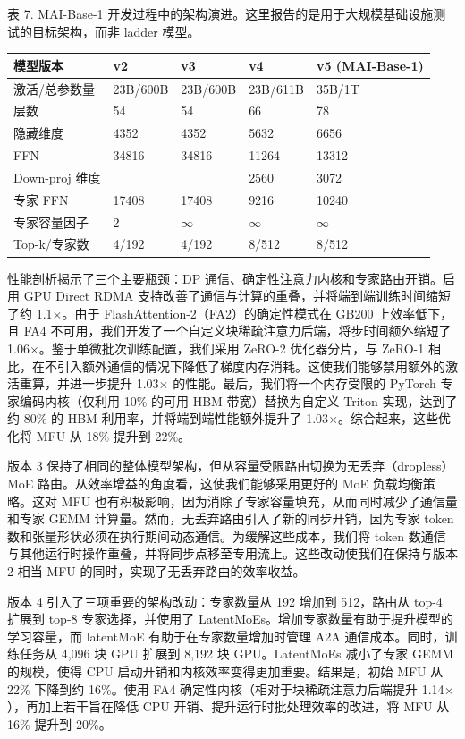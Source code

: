 表 7. MAI-Base-1 开发过程中的架构演进。这里报告的是用于大规模基础设施测试的目标架构，而非 ladder 模型。

{\def\LTcaptype{none} %
\begin{longtable}[]{@{}|l|l|l|l|l|@{}}
\toprule\noalign{}
\endhead
\bottomrule\noalign{}
\endlastfoot
\hline
模型版本 & v2 & v3 & v4 & v5 (MAI-Base-1) \\
\hline
激活/总参数量 & 23B/600B & 23B/600B & 23B/611B & 35B/1T \\
\hline
层数 & 54 & 54 & 66 & 78 \\
\hline
隐藏维度 & 4352 & 4352 & 5632 & 6656 \\
\hline
FFN & 34816 & 34816 & 11264 & 13312 \\
\hline
Down-proj 维度 & & & 2560 & 3072 \\
\hline
专家 FFN & 17408 & 17408 & 9216 & 10240 \\
\hline
专家容量因子 & 2 & $\infty$ & $\infty$ & $\infty$ \\
\hline
Top-k/专家数 & 4/192 & 4/192 & 8/512 & 8/512 \\
\hline
\end{longtable}
}

性能剖析揭示了三个主要瓶颈：DP 通信、确定性注意力内核和专家路由开销。启用 GPU Direct RDMA 支持改善了通信与计算的重叠，并将端到端训练时间缩短了约 1.1$\times$。由于 FlashAttention-2（FA2）的确定性模式在 GB200 上效率低下，且 FA4 不可用，我们开发了一个自定义块稀疏注意力后端，将步时间额外缩短了 1.06$\times$。鉴于单微批次训练配置，我们采用 ZeRO-2 优化器分片，与 ZeRO-1 相比，在不引入额外通信的情况下降低了梯度内存消耗。这使我们能够禁用额外的激活重算，并进一步提升 1.03$\times$ 的性能。最后，我们将一个内存受限的 PyTorch 专家编码内核（仅利用 10\% 的可用 HBM 带宽）替换为自定义 Triton 实现，达到了约 80\% 的 HBM 利用率，并将端到端性能额外提升了 1.03$\times$。综合起来，这些优化将 MFU 从 18\% 提升到 22\%。

版本 3 保持了相同的整体模型架构，但从容量受限路由切换为无丢弃（dropless）MoE 路由。从效率增益的角度看，这使我们能够采用更好的 MoE 负载均衡策略。这对 MFU 也有积极影响，因为消除了专家容量填充，从而同时减少了通信量和专家 GEMM 计算量。然而，无丢弃路由引入了新的同步开销，因为专家 token 数和张量形状必须在执行期间动态通信。为缓解这些成本，我们将 token 数通信与其他运行时操作重叠，并将同步点移至专用流上。这些改动使我们在保持与版本 2 相当 MFU 的同时，实现了无丢弃路由的效率收益。

版本 4 引入了三项重要的架构改动：专家数量从 192 增加到 512，路由从 top-4 扩展到 top-8 专家选择，并使用了 LatentMoEs。增加专家数量有助于提升模型的学习容量，而 latentMoE 有助于在专家数量增加时管理 A2A 通信成本。同时，训练任务从 4,096 块 GPU 扩展到 8,192 块 GPU。LatentMoEs 减小了专家 GEMM 的规模，使得 CPU 启动开销和内核效率变得更加重要。结果是，初始 MFU 从 22\% 下降到约 16\%。使用 FA4 确定性内核（相对于块稀疏注意力后端提升 1.14$\times$），再加上若干旨在降低 CPU 开销、提升运行时批处理效率的改进，将 MFU 从 16\% 提升到 20\%。

